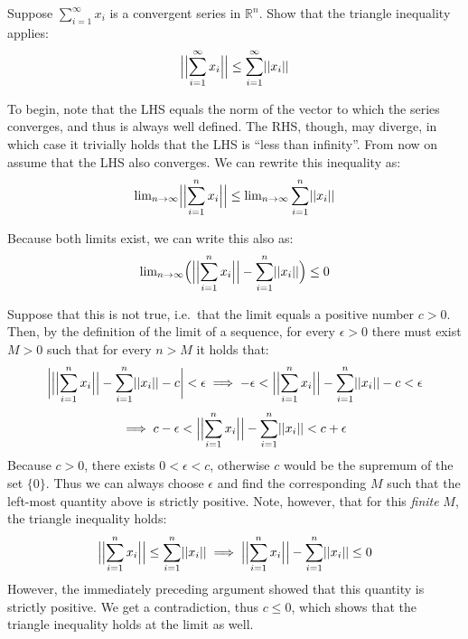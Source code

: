 \begin{exercise}{9}
    Suppose $\sum_{i=1}^{\infty}x_i$ is a convergent series in $\mathbb{R}^n$. Show that the triangle inequality applies:
    $$\Bigl\lvert\Bigl\lvert \sum_{i=1}^{\infty} x_i \Bigr\rvert\Bigr\rvert \leq \sum_{i=1}^{\infty}\lvert\lvert x_i \rvert\rvert$$
\end{exercise}

\begin{solution}

    To begin, note that the LHS equals the norm of the vector to which the series converges, and thus is always well defined. The RHS, though, may diverge, in which case it trivially holds that the LHS is ``less than infinity''. From now on assume that the LHS also converges. We can rewrite this inequality as:
    $$\text{lim}_{n\rightarrow \infty} \Bigl\lvert\Bigl\lvert \sum_{i=1}^{n} x_i \Bigr\rvert \Bigr\rvert \leq \text{lim}_{n\rightarrow \infty} \sum_{i=1}^{n}\lvert \lvert x_i \rvert \rvert$$

    Because both limits exist, we can write this also as:
    $$\text{lim}_{n \rightarrow \infty}\Bigl( \Bigl\lvert\Bigl\lvert \sum_{i=1}^{n} x_i \Bigr\rvert \Bigr\rvert - \sum_{i=1}^{n}\lvert \lvert x_i \rvert \rvert\Bigr) \leq 0$$

    Suppose that this is not true, i.e.\ that the limit equals a positive number $c > 0$. Then, by the definition of the limit of a sequence, for every $\epsilon > 0$ there must exist $M > 0$ such that for every $n > M$ it holds that:
    $$\biggl\lvert \Bigl\lvert \Bigl\lvert \sum_{i=1}^{n}x_i \Bigr\rvert \Big\rvert - \sum_{i=1}^{n}\lvert \lvert x_i \rvert \rvert - c\biggr| < \epsilon \implies -\epsilon < \Bigl\lvert \Bigl\lvert \sum_{i=1}^{n}x_i \Bigr\rvert \Big\rvert - \sum_{i=1}^{n}\lvert \lvert x_i \rvert \rvert - c < \epsilon$$
    $$\implies c - \epsilon < \Bigl\lvert \Bigl\lvert \sum_{i=1}^{n}x_i \Bigr\rvert \Big\rvert - \sum_{i=1}^{n}\lvert \lvert x_i \rvert \rvert < c + \epsilon$$
    Because $c > 0$, there exists $0 < \epsilon < c$, otherwise $c$ would be the supremum of the set $\{0\}$. Thus we can always choose $\epsilon$ and find the corresponding $M$ such that the left-most quantity above is strictly positive. Note, however, that for this \textit{finite} $M$, the triangle inequality holds:
    $$\Bigl\lvert \Bigl\lvert \sum_{i=1}^{n} x_i \Bigr\rvert \Bigr\rvert \leq \sum_{i=1}^{n}\lvert \lvert x_i \rvert \rvert \implies \Bigl\lvert \Bigl\lvert \sum_{i=1}^{n} x_i \Bigr\rvert \Bigr\rvert - \sum_{i=1}^{n}\lvert \lvert x_i \rvert \rvert \leq 0$$
    However, the immediately preceding argument showed that this quantity is strictly positive. We get a contradiction, thus $c \leq 0$, which shows that the triangle inequality holds at the limit as well.


\end{solution}
